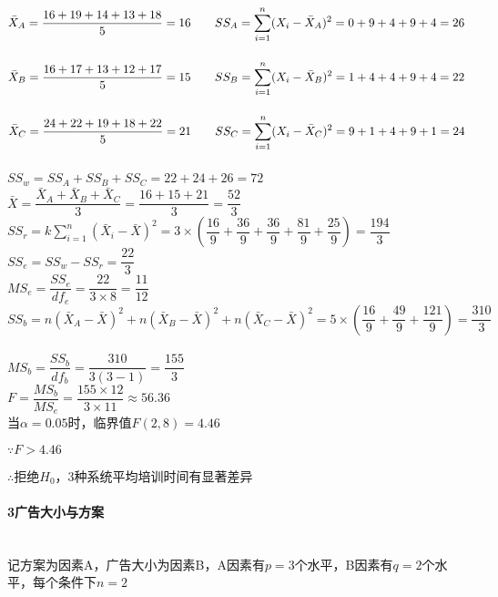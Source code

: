 \documentclass[UTF8]{ctexart}
\begin{document}
$\bar{X}_A=\dfrac{16+19+14+13+18}{5}=16 \qquad SS_A=\displaystyle \sum_{i=1}^n (X_i-\Bar{X}_A)^2=0+9+4+9+4=26$
~\\

$\bar{X}_B=\dfrac{16+17+13+12+17}{5}=15 \qquad SS_B=\displaystyle \sum_{i=1}^n (X_i-\Bar{X}_B)^2=1+4+4+9+4=22$
~\\

$\bar{X}_C=\dfrac{24+22+19+18+22}{5}=21 \qquad SS_C=\displaystyle \sum_{i=1}^n (X_i-\Bar{X}_C)^2=9+1+4+9+1=24$
~\\

$SS_w=SS_A+SS_B+SS_C=22+24+26=72$
~\\

$\bar{X}=\dfrac{\bar{X}_A+\bar{X}_B+\bar{X}_C}{3}=\dfrac{16+15+21}{3}=\dfrac{52}{3}$
~\\

$SS_r=k\displaystyle \sum_{i=1}^{n}(\bar{X}_i-\bar{X})^2=3\times(\dfrac{16}{9}+\dfrac{36}{9}+\dfrac{36}{9}+\dfrac{81}{9}+\dfrac{25}{9})=\dfrac{194}{3}$
~\\

$SS_e=SS_w-SS_r=\dfrac{22}{3}$
~\\

$MS_e=\dfrac{SS_e}{df_e}=\dfrac{22}{3\times 8}=\dfrac{11}{12}$
~\\

$SS_b=n(\bar{X}_A-\bar{X})^2+n(\bar{X}_B-\bar{X})^2+n(\bar{X}_C-\bar{X})^2=5\times(\dfrac{16}{9}+\dfrac{49}{9}+\dfrac{121}{9})=\dfrac{310}{3}$
~\\

$MS_b=\dfrac{SS_b}{df_b}=\dfrac{310}{3(3-1)}=\dfrac{155}{3}$
~\\

$F=\dfrac{MS_b}{MS_e}=\dfrac{155\times 12}{3\times11}\approx56.36$
~\\

当$\alpha=0.05$时，临界值$F(2,8)=4.46$

$\because F > 4.46$

$\therefore$拒绝$H_0$，3种系统平均培训时间有显著差异

\paragraph{3广告大小与方案}
~\\

记方案为因素A，广告大小为因素B，A因素有$p=3$个水平，B因素有$q=2$个水平，每个条件下$n=2$
~\\
\end{document}
